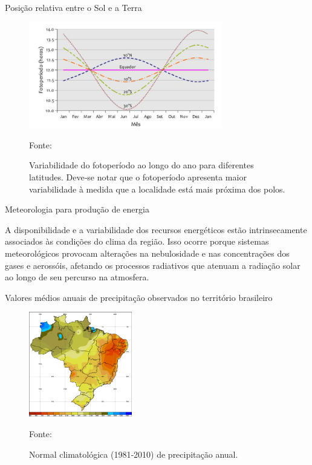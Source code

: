 \documentclass{beamer}
\begin{document}

\begin{frame}{Posição relativa entre o Sol e a Terra}

\begin{figure}[H]
    \centering
    \includegraphics[width=0.75\textwidth]{./Figuras/dia_luz.png}
    \caption{Variabilidade do fotoperíodo ao longo do ano para diferentes latitudes. Deve‐se notar que o fotoperíodo apresenta maior variabilidade à medida que a localidade está mais próxima dos polos.}{Fonte: \cite{atlas2017}}
   \label{fig:dia_luz}
\end{figure}

\end{frame}


\begin{frame}{Meteorologia para produção de energia}


A disponibilidade e a variabilidade dos recursos energéticos estão intrinsecamente associados às condições do clima da região. Isso ocorre porque sistemas meteorológicos provocam alterações na nebulosidade e nas concentrações dos gases e aerossóis, afetando os processos radiativos que atenuam a radiação solar ao longo de seu percurso na atmosfera.

\end{frame}


\begin{frame}{Valores médios anuais de precipitação observados no território brasileiro}

\begin{figure}[H]
    \centering
    \includegraphics[width=0.4\textwidth]{./Figuras/chuvas_clima.png}
    \caption{Normal climatológica (1981‐2010)  de precipitação anual.}{Fonte: \cite{INMET}}
   \label{fig:chuvas_clima}
\end{figure}

\end{frame}
\end{document}
